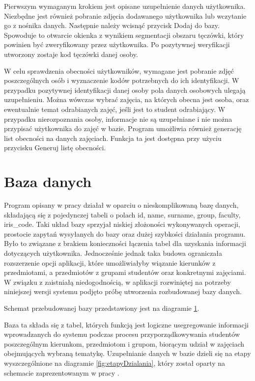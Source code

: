 Pierwszym wymaganym krokiem jest opisane uzupełnienie danych użytkownika. Niezbędne jest również pobranie zdjęcia dodawanego użytkownika lub wczytanie  go z nośnika danych. Następnie należy wcisnąć przycisk Dodaj do bazy. Spowoduje to otwarcie okienka z wynikiem segmentacji obszaru tęczówki, który powinien być zweryfikowany przez użytkownika. Po pozytywnej weryfikacji utworzony zostaje kod tęczówki danej osoby.

W celu sprawdzenia obecności użytkowników, wymagane jest pobranie zdjęć poszczególnych osób i wyznaczenie kodów potrzebnych do ich identyfikacji. W przypadku pozytywnej identyfikacji danej osoby pola danych osobowych ulegają uzupełnieniu. Można wówczas wybrać zajęcia, na których obecna jest osoba, oraz ewentualnie temat odrabianych zajęć, jeśli jest to student odrabiający. W przypadku nierozpoznania osoby, informacje nie są uzupełniane i nie można przypisać użytkownika do zajęć w bazie.
Program umożliwia również generację list obecności na danych zajęciach. Funkcja ta jest dostępna przy użyciu przycisku Generuj listę obecności.
\section{Baza danych}
\label{sec:bazadanych}

Program opisany w pracy \cite{Gl11} działał w oparciu o nieskomplikowaną bazę danych, składającą się z pojedynczej tabeli o polach id, name, surname, group, faculty, iris\_code. Taki układ bazy sprzyjał niskiej złożoności wykonywanych operacji, prostocie zapytań wysyłanych do bazy oraz dużej szybkości działania programu. Było to związane z brakiem konieczności łączenia tabel dla uzyskania informacji dotyczących użytkownika. Jednocześnie jednak taka budowa ograniczała rozszerzenie opcji aplikacji, które umożliwiałyby wiązanie kierunków z przedmiotami, a przedmiotów z grupami studentów oraz konkretnymi zajęciami. W związku z zaistniałą niedogodnością, w aplikacji rozwiniętej na potrzeby niniejszej wersji systemu podjęto próbę utworzenia rozbudowanej bazy danych.

Schemat przebudowanej bazy przedstawiony jest na diagramie \ref{fig:bazaDanych}.

 
\begin{figure}
\begin{center}
\label{fig:bazaDanych}
\end{center}
\end{figure}

Baza ta składa się z tabel, których funkcją jest logiczne usegregowanie informacji wprowadzanych do systemu podczas procesu przyporządkowywania studentów poszczególnym kierunkom, przedmiotom i grupom, biorącym udział w zajęciach obejmujących wybraną tematykę. Uzupełnianie danych w bazie dzieli się na etapy wyszczególnione na diagramie \ref{fig:etapyDzialania}, który został oparty na schemacie zaprezentowanym w pracy \cite{Gl11}.

